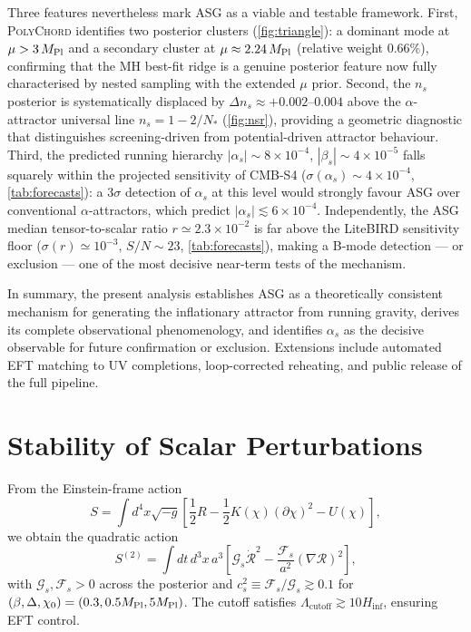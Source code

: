 \documentclass[11pt,a4paper]{article}
\begin{document}
Three features nevertheless mark ASG as a viable and testable framework. First, \textsc{PolyChord} identifies two posterior clusters (\cref{fig:triangle}): a dominant mode at $\mu>3\,M_{\rm Pl}$ and a secondary cluster at $\mu\approx2.24\,M_{\rm Pl}$ (relative weight 0.66\%), confirming that the MH best-fit ridge is a genuine posterior feature now fully characterised by nested sampling with the extended $\mu$ prior. Second, the $n_s$ posterior is systematically displaced by $\Delta n_s\approx+0.002$--$0.004$ above the $\alpha$-attractor universal line $n_s=1-2/N_*$ (\cref{fig:nsr}), providing a geometric diagnostic that distinguishes screening-driven from potential-driven attractor behaviour. Third, the predicted running hierarchy $|\alpha_s|\sim8\times10^{-4}$, $|\beta_s|\sim4\times10^{-5}$ falls squarely within the projected sensitivity of CMB-S4 ($\sigma(\alpha_s)\sim4\times10^{-4}$, \cref{tab:forecasts}): a $3\sigma$ detection of $\alpha_s$ at this level would strongly favour ASG over conventional $\alpha$-attractors, which predict $|\alpha_s|\lesssim6\times10^{-4}$. Independently, the ASG median tensor-to-scalar ratio $r\simeq2.3\times10^{-2}$ is far above the LiteBIRD sensitivity floor ($\sigma(r)\simeq10^{-3}$, $S/N\sim23$, \cref{tab:forecasts}), making a B-mode detection --- or exclusion --- one of the most decisive near-term tests of the mechanism.

In summary, the present analysis establishes ASG as a theoretically consistent mechanism for generating the inflationary attractor from running gravity, derives its complete observational phenomenology, and identifies $\alpha_s$ as the decisive observable for future confirmation or exclusion. Extensions include automated EFT matching to UV completions, loop-corrected reheating, and public release of the full pipeline.

\section{Stability of Scalar Perturbations}
\label{sec:stability}
From the Einstein-frame action
\begin{equation}
S=\int d^{4}x\sqrt{-g}\left[\frac{1}{2}R-\frac{1}{2}K(\chi)(\partial\chi)^{2}-U(\chi)\right],
\end{equation}
we obtain the quadratic action
\begin{equation}
S^{(2)}=\int dt\,d^{3}x\,a^{3}\left[\mathcal{G}_{s}\dot{\mathcal{R}}^{2}-\frac{\mathcal{F}_{s}}{a^{2}}(\nabla\mathcal{R})^{2}\right],
\end{equation}
with $\mathcal{G}_{s},\mathcal{F}_{s}>0$ across the posterior and $c_{s}^{2}\equiv\mathcal{F}_{s}/\mathcal{G}_{s}\gtrsim0.1$ for $(\beta,\Delta,\chi_{0})=(0.3,0.5M_{\rm Pl},5M_{\rm Pl})$. The cutoff satisfies $\Lambda_{\text{cutoff}}\gtrsim10H_{\text{inf}}$, ensuring EFT control.
\end{document}
